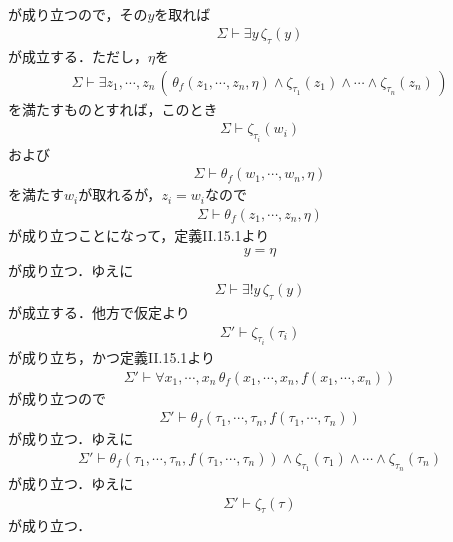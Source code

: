 \begin{description}
\begin{align}
			\end{align}
			が成り立つので，その$y$を取れば
			\begin{align}
				\Sigma \vdash \exists y\, \zeta_{\tau}(y)
			\end{align}
			が成立する．ただし，$\eta$を
			\begin{align}
				\Sigma \vdash \exists z_{1}, \cdots, z_{n}\, \left(\, 
				\theta_{f}(z_{1},\cdots,z_{n},\eta) \wedge \zeta_{\tau_{1}}(z_{1}) \wedge
				\cdots \wedge \zeta_{\tau_{n}}(z_{n})\, \right)
			\end{align}
			を満たすものとすれば，このとき
			\begin{align}
				\Sigma \vdash \zeta_{\tau_{i}}(w_{i})
			\end{align}
			および
			\begin{align}
				\Sigma \vdash \theta_{f}(w_{1},\cdots,w_{n},\eta)
			\end{align}
			を満たす$w_{i}$が取れるが，$z_{i} = w_{i}$なので
			\begin{align}
				\Sigma \vdash \theta_{f}(z_{1},\cdots,z_{n},\eta)
			\end{align}
			が成り立つことになって，定義I\hspace{-.1em}I.15.1より
			\begin{align}
				y = \eta
			\end{align}
			が成り立つ．ゆえに
			\begin{align}
				\Sigma \vdash \exists! y\, \zeta_{\tau}(y)
			\end{align}
			が成立する．他方で仮定より
			\begin{align}
				\Sigma' \vdash \zeta_{\tau_{i}}(\tau_{i})
			\end{align}
			が成り立ち，かつ定義I\hspace{-.1em}I.15.1より
			\begin{align}
				\Sigma' \vdash \forall x_{1},\cdots,x_{n}\,
				\theta_{f}(x_{1},\cdots,x_{n},f(x_{1},\cdots,x_{n}))
			\end{align}
			が成り立つので
			\begin{align}
				\Sigma' \vdash \theta_{f}(\tau_{1},\cdots,\tau_{n},f(\tau_{1},\cdots,\tau_{n}))
			\end{align}
			が成り立つ．ゆえに
			\begin{align}
				\Sigma' \vdash \theta_{f}(\tau_{1},\cdots,\tau_{n},f(\tau_{1},\cdots,\tau_{n})) \wedge \zeta_{\tau_{1}}(\tau_{1}) \wedge \cdots \wedge \zeta_{\tau_{n}}(\tau_{n})
			\end{align}
			が成り立つ．ゆえに
			\begin{align}
				\Sigma' \vdash \zeta_{\tau}(\tau)
			\end{align}
			が成り立つ．
			

\end{description}
